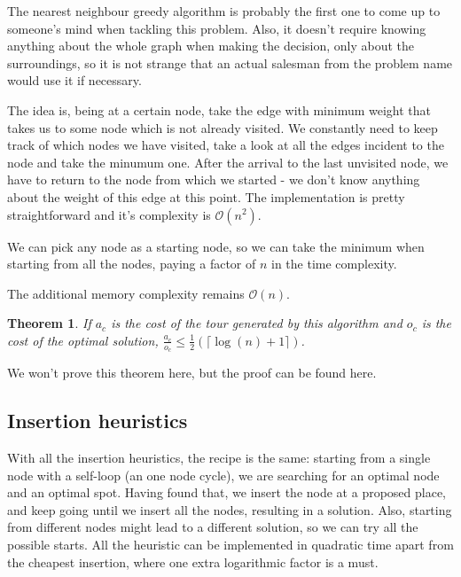 \documentclass[12pt,twoside,notitlepage]{report}
\newtheorem{theorem}{Theorem}
\begin{document}
The nearest neighbour greedy algorithm is probably the first one to come up to someone's mind when tackling this problem. Also, it doesn't require knowing anything about the whole graph when making the decision, only about the surroundings, so it is not strange that an actual salesman from the problem name would use it if necessary. 

The idea is, being at a certain node, take the edge with minimum weight that takes us to some node which is not already visited. We constantly need to keep track of which nodes we have visited, take a look at all the edges incident to the node and take the minumum one. After the arrival to the last unvisited node, we have to return to the node from which we started - we don't know anything about the weight of this edge at this point. The implementation is pretty straightforward and it's complexity is $\mathcal{O}(n^2)$. 

We can pick any node as a starting node, so we can take the minimum when starting from all the nodes, paying a factor of $n$ in the time complexity.

The additional memory complexity remains $\mathcal{O}(n)$.

\smallskip 

\begin{theorem}

If $a_c$ is the cost of the tour generated by this algorithm and $o_c$ is the cost of the optimal solution, $\frac{a_c}{o_c} \leq \frac{1}{2}(\lceil\log(n) + 1\rceil)$.

\end{theorem}

We won't prove this theorem here, but the proof can be found here\cite{Rosenkrantz_1977}.

\subsection{Insertion heuristics}

With all the insertion heuristics, the recipe is the same: starting from a single node with a self-loop (an one node cycle), we are searching for an optimal node and an optimal spot. Having found that, we insert the node at a proposed place, and keep going until we insert all the nodes, resulting in a solution. Also, starting from different nodes might lead to a different solution, so we can try all the possible starts. All the heuristic can be implemented in quadratic time apart from the cheapest insertion, where one extra logarithmic factor is a must.
\end{document}
